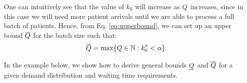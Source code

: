 One can intuitively see that the value of $k_0$ will increase as $Q$ increases, since in this case we will need more patient arrivals until we are able to process a full batch of patients. Hence, from Eq. \eqref{eq:upperbound}, we can set up an upper bound $\overline{Q}$ for the batch size such that:
%
\begin{equation} \label{eq:overbound}
\overline{Q} = \max \{ Q \in \mathbb N : k_0^{\tau} < \alpha \}.
\end{equation}


In the example below, we show how to derive general bounds $\underline{Q}$ and $\overline{Q}$ for a given demand distribution and waiting time requirements.

